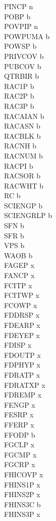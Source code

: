 \documentclass[12pt]{article}
\begin{document}
PINCP n\\
POBP b\\
POVPIP n\\
POWPUMA b\\
POWSP b\\
PRIVCOV b\\
PUBCOV b\\
QTRBIR b\\
RAC1P b\\
RAC2P b\\
RAC3P b\\
RACAIAN b\\
RACASN b\\
RACBLK b\\
RACNH b\\
RACNUM b\\
RACPI b\\
RACSOR b\\
RACWHT b\\
RC b\\
SCIENGP b\\
SCIENGRLP b\\
SFN b\\
SFR b\\
VPS b\\
WAOB b\\
FAGEP x\\
FANCP x\\
FCITP x\\
FCITWP x\\
FCOWP x\\
FDDRSP x\\
FDEARP x\\
FDEYEP x\\
FDISP x\\
FDOUTP x\\
FDPHYP x\\
FDRATP x\\
FDRATXP x\\
FDREMP x\\
FENGP x\\
FESRP x\\
FFERP x\\
FFODP b\\
FGCLP x\\
FGCMP x\\
FGCRP x\\
FHICOVP x\\
FHINS1P x\\
FHINS2P x\\
FHINS3C b\\
FHINS3P x\\
\end{document}

